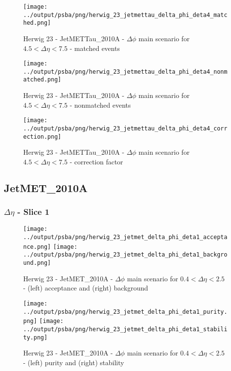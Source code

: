 \documentclass[11pt]{book}
\begin{document}
\begin{figure}[ht]
\centering
\texttt{[image: ../output/psba/png/herwig\_23\_jetmettau\_delta\_phi\_deta4\_matched.png]}
\caption{Herwig 23 - JetMETTau\_2010A - $\Delta\phi$ main scenario for $4.5 < \Delta\eta < 7.5$ - matched events}
\label{fig:hw_23_jetmettau_delta_phi_deta4_matched}
\end{figure}

\begin{figure}[ht]
\centering
\texttt{[image: ../output/psba/png/herwig\_23\_jetmettau\_delta\_phi\_deta4\_nonmatched.png]}
\caption{Herwig 23 - JetMETTau\_2010A - $\Delta\phi$ main scenario for $4.5 < \Delta\eta < 7.5$ - nonmatched events}
\label{fig:hw_23_jetmettau_delta_phi_deta4_nonmatched}
\end{figure}

\begin{figure}[ht]
\centering
\texttt{[image: ../output/psba/png/herwig\_23\_jetmettau\_delta\_phi\_deta4\_correction.png]}
\caption{Herwig 23 - JetMETTau\_2010A - $\Delta\phi$ main scenario for $4.5 < \Delta\eta < 7.5$ - correction factor}
\label{fig:hw_23_jetmettau_delta_phi_deta4_correction}
\end{figure}


\clearpage
\subsection{JetMET\_2010A}

\subsubsection{$\Delta\eta$ - Slice 1}
\begin{figure}[ht]
\centering
\texttt{[image: ../output/psba/png/herwig\_23\_jetmet\_delta\_phi\_deta1\_acceptance.png]}
\texttt{[image: ../output/psba/png/herwig\_23\_jetmet\_delta\_phi\_deta1\_background.png]}
\caption{Herwig 23 - JetMET\_2010A - $\Delta\phi$ main scenario for $0.4 < \Delta\eta < 2.5$ - (left) acceptance and (right) background}
\label{fig:hw_23_jetmet_delta_phi_deta1_ab}
\end{figure}

\begin{figure}[ht]
\centering
\texttt{[image: ../output/psba/png/herwig\_23\_jetmet\_delta\_phi\_deta1\_purity.png]}
\texttt{[image: ../output/psba/png/herwig\_23\_jetmet\_delta\_phi\_deta1\_stability.png]}
\caption{Herwig 23 - JetMET\_2010A - $\Delta\phi$ main scenario for $0.4 < \Delta\eta < 2.5$ - (left) purity and (right) stability}
\label{fig:hw_23_jetmet_delta_phi_deta1_ps}
\end{figure}
\end{document}
